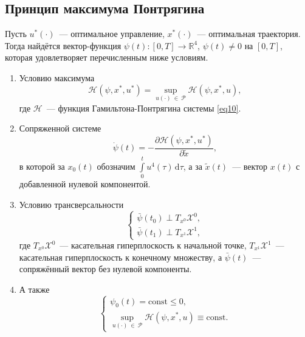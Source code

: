 \documentclass[a4paper,12pt]{article}
\begin{document}
\subsection{Принцип максимума Понтрягина}
Пусть $u^{*}(\cdot)$~--- оптимальное управление, $x^{*}(\cdot)$~--- оптимальная траектория. Тогда найдётся вектор-функция  $\psi(t) \! : [0, T] \rightarrow \mathbb{R}^4$, $\psi(t) \neq 0$ на $[0, T]$, которая удовлетворяет перечисленным ниже условиям.
\begin{enumerate}

\item Условию максимума
\hypertarget{p21}{}
\begin{equation}\label{eq21} 
\mathcal{H}(\psi, x^*, u^*) = \sup_{u(\cdot) \ \in \ \mathcal{P}}{\mathcal{H}(\psi, x^*, u)},
\end{equation} 
где $\mathcal{H}$~--- функция Гамильтона-Понтрягина системы \eqref{eq10}.

\item Сопряженной системе
\hypertarget{p22}{}
\begin{equation}\label{eq22}
\dot{\psi}(t) = - \dfrac{\partial{\mathcal{H}(\psi, x^*, u^*)}}{\partial{\tilde{x}}},
\end{equation}
в которой за $x_0(t)$ обозначим $\int\limits_{0}^{t}{u^4(\tau)} \, \mathrm{d}\tau$, а за $\tilde{x}(t)$~--- вектор $x(t)$ с добавленной нулевой компонентой.

\item Условию трансверсальности
\hypertarget{p23}{}
\begin{equation}\label{eq23}
	\begin{cases}
		\bar{\psi}(t_0) \perp T_{x^0}\mathcal{X}^0, \\
		\bar{\psi}(t_1) \perp T_{x^1}\mathcal{X}^1,
	\end{cases}
\end{equation} 
где $T_{x^0}\mathcal{X}^0$~--- касательная гиперплоскость к начальной точке, $T_{x^1}\mathcal{X}^1$~--- касательная гиперплоскость к конечному множеству, а $\bar{\psi}(t)$~--- сопряжённый вектор без нулевой компоненты.

\item А также
\hypertarget{p24}{}
\begin{equation}\label{eq24}
	\begin{cases}
		\psi_0(t) = \mathrm{const} \leqslant 0, \\
		\sup\limits_{u(\cdot) \ \in \ \mathcal{P}}{\mathcal{H}(\psi, x^*, u)} \equiv \mathrm{const}.
	\end{cases}
\end{equation} 

\end{enumerate}
\end{document}
